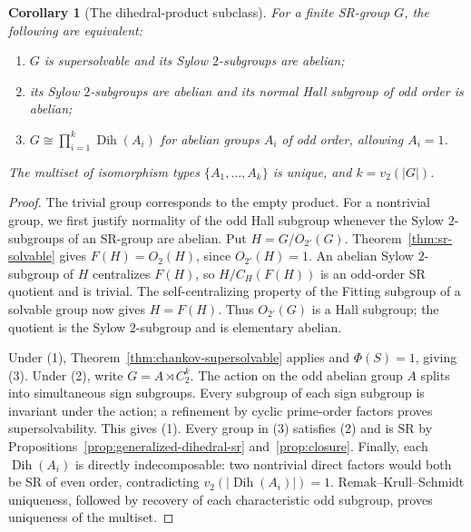 \documentclass[11pt,a4paper]{amsart}
\newtheorem{corl}[thm]{Corollary}
\theoremstyle{definition}
\theoremstyle{remark}
\numberwithin{equation}{section}
\begin{document}
\begin{corl}[The dihedral-product subclass]\label{thm:dihedral-subclass}
For a finite SR-group $G$, the following are equivalent:
\begin{enumerate}
\item $G$ is supersolvable and its Sylow $2$-subgroups are abelian;
\item its Sylow $2$-subgroups are abelian and its normal Hall subgroup
of odd order is abelian;
\item $G\cong\prod_{i=1}^k\operatorname{Dih}(A_i)$ for abelian
groups $A_i$ of odd order, allowing $A_i=1$.
\end{enumerate}
The multiset of isomorphism types $\{A_1,\ldots,A_k\}$ is unique,
and $k=v_2(|G|)$.
\end{corl}
\begin{proof}
The trivial group corresponds to the empty product. For a nontrivial
group, we first justify normality of the odd Hall subgroup whenever the
Sylow $2$-subgroups of an SR-group are abelian. Put
$H=G/O_{2'}(G)$. Theorem~\ref{thm:sr-solvable} gives
$F(H)=O_2(H)$, since
$O_{2'}(H)=1$. An abelian Sylow $2$-subgroup of $H$ centralizes
$F(H)$, so $H/C_H(F(H))$ is an odd-order SR quotient and is trivial.
The self-centralizing property of the Fitting subgroup of a solvable
group now gives $H=F(H)$. Thus $O_{2'}(G)$ is a Hall subgroup;
the quotient is the Sylow $2$-subgroup and is elementary abelian.

Under (1), Theorem~\ref{thm:chankov-supersolvable} applies and
$\Phi(S)=1$, giving (3).
Under (2), write $G=A\rtimes C_2^k$. The action on the odd abelian
group $A$ splits into simultaneous sign subgroups. Every subgroup of
each sign subgroup is invariant under the action; a refinement by
cyclic prime-order factors proves supersolvability. This gives (1).
Every group in (3) satisfies (2) and is SR by
Propositions~\ref{prop:generalized-dihedral-sr} and~\ref{prop:closure}.
Finally, each $\operatorname{Dih}(A_i)$ is directly indecomposable:
two nontrivial direct factors would both be SR of even order,
contradicting $v_2(|\operatorname{Dih}(A_i)|)=1$.
Remak--Krull--Schmidt uniqueness, followed by recovery of each
characteristic odd subgroup, proves uniqueness of the multiset.
\end{proof}
\end{document}
